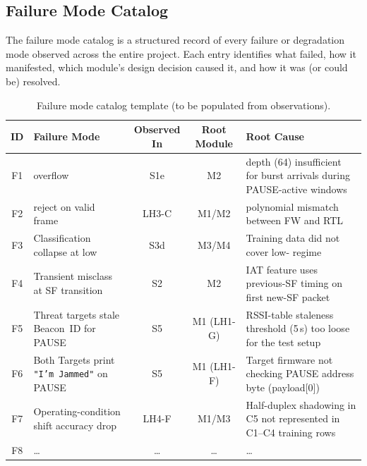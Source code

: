 \documentclass[11pt,letterpaper]{article}
\begin{document}
	\subsection{Failure Mode Catalog}

	The failure mode catalog is a structured record of every failure or degradation mode observed across the entire project. Each entry identifies what failed, how it manifested, which module's design decision caused it, and how it was (or could be) resolved.

	\begin{table}[ht!]
		\centering
		\caption{Failure mode catalog template (to be populated from observations).}
		\label{tab:failure_catalog}
		\renewcommand{\arraystretch}{1.3}
		\begin{tabularx}{\textwidth}{c l c c X}
			\toprule
			\textbf{ID} & \textbf{Failure Mode} & \textbf{Observed In} & \textbf{Root Module} & \textbf{Root Cause} \\
			\midrule
			F1 & \FIFO{} overflow & S1e & M2 & \FIFO{} depth (64) insufficient for burst arrivals during PAUSE-active windows \\
			F2 & \CRC{} reject on valid frame & LH3-C & M1/M2 & \CRC{} polynomial mismatch between FW and RTL \\
			F3 & Classification collapse at low \SNR{} & S3d & M3/M4 & Training data did not cover low-\SNR{} regime \\
			F4 & Transient misclass at SF transition & S2 & M2 & IAT feature uses previous-SF timing on first new-SF packet \\
			F5 & Threat targets stale Beacon~ID for PAUSE & S5 & M1 (LH1-G) & RSSI-table staleness threshold (5\,s) too loose for the test setup \\
			F6 & Both Targets print \texttt{"I'm Jammed"} on PAUSE & S5 & M1 (LH1-F) & Target firmware not checking PAUSE address byte (payload[0]) \\
			F7 & Operating-condition shift accuracy drop & LH4-F & M1/M3 & Half-duplex shadowing in C5 not represented in C1--C4 training rows \\
			F8 & \ldots & \ldots & \ldots & \ldots \\
			\bottomrule
		\end{tabularx}
	\end{table}
\end{document}
